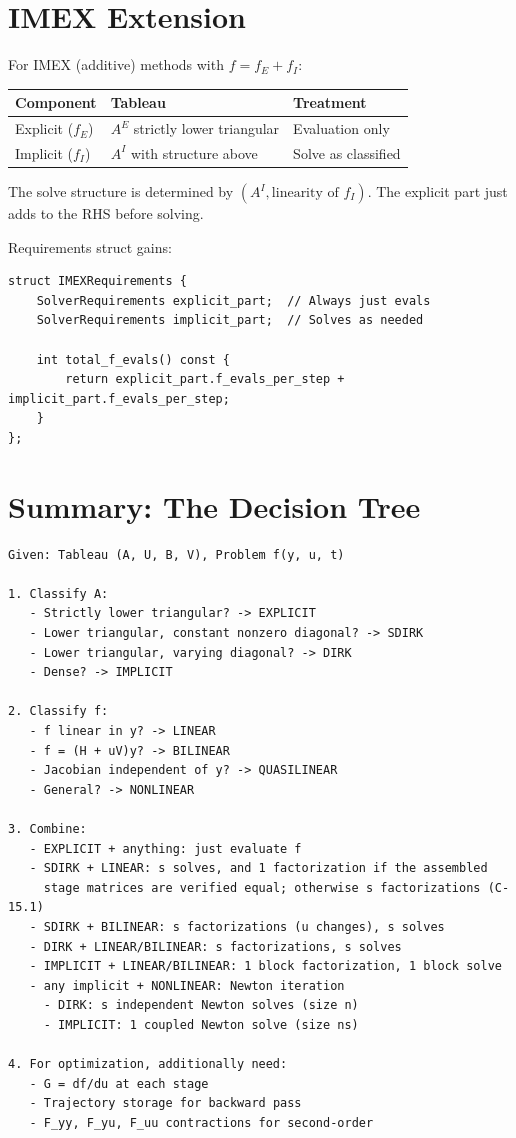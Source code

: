 \documentclass[11pt]{article}
\begin{document}
\section{IMEX Extension}

For IMEX (additive) methods with $f = f_E + f_I$:

\begin{center}
\begin{tabular}{lll}
\toprule
Component & Tableau & Treatment \\
\midrule
Explicit ($f_E$) & $A^E$ strictly lower triangular & Evaluation only \\
Implicit ($f_I$) & $A^I$ with structure above & Solve as classified \\
\bottomrule
\end{tabular}
\end{center}

The solve structure is determined by $(A^I, \text{linearity of } f_I)$. The explicit part just adds to the RHS before solving.

Requirements struct gains:
\begin{verbatim}
struct IMEXRequirements {
    SolverRequirements explicit_part;  // Always just evals
    SolverRequirements implicit_part;  // Solves as needed
    
    int total_f_evals() const {
        return explicit_part.f_evals_per_step + implicit_part.f_evals_per_step;
    }
};
\end{verbatim}

\section{Summary: The Decision Tree}

\begin{verbatim}
Given: Tableau (A, U, B, V), Problem f(y, u, t)

1. Classify A:
   - Strictly lower triangular? -> EXPLICIT
   - Lower triangular, constant nonzero diagonal? -> SDIRK  
   - Lower triangular, varying diagonal? -> DIRK
   - Dense? -> IMPLICIT

2. Classify f:
   - f linear in y? -> LINEAR
   - f = (H + uV)y? -> BILINEAR
   - Jacobian independent of y? -> QUASILINEAR
   - General? -> NONLINEAR

3. Combine:
   - EXPLICIT + anything: just evaluate f
   - SDIRK + LINEAR: s solves, and 1 factorization if the assembled
     stage matrices are verified equal; otherwise s factorizations (C-15.1)
   - SDIRK + BILINEAR: s factorizations (u changes), s solves
   - DIRK + LINEAR/BILINEAR: s factorizations, s solves
   - IMPLICIT + LINEAR/BILINEAR: 1 block factorization, 1 block solve
   - any implicit + NONLINEAR: Newton iteration
     - DIRK: s independent Newton solves (size n)
     - IMPLICIT: 1 coupled Newton solve (size ns)

4. For optimization, additionally need:
   - G = df/du at each stage
   - Trajectory storage for backward pass
   - F_yy, F_yu, F_uu contractions for second-order
\end{verbatim}
\end{document}
